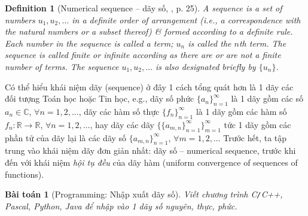 \documentclass{article}
\newtheorem{baitoan}{Bài toán}
\newtheorem{definition}{Definition}
\begin{document}
\begin{definition}[Numerical sequence -- dãy số, \cite{Wrede_Spiegel2010}, p. 25]
    A {\rm sequence} is a set of numbers $u_1,u_2,\ldots$ in a definite order of arrangement (i.e., a {\rm correspondence} with the natural numbers or a subset thereof) \& formed according to a definite rule. Each number in the sequence is called a {\rm term}; $u_n$ is called the {\rm$n$th term}. The sequence is called {\rm finite} or {\rm infinite} according as there are or are not a finite number of terms. The sequence $u_1,u_2,\ldots$ is also designated briefly by $\{u_n\}$.
\end{definition}
Có thể hiểu khái niệm dãy (sequence) ở đây 1 cách tổng quát hơn là 1 dãy các đối tượng Toán học hoặc Tin học, e.g., dãy số phức $\{a_n\}_{n=1}^\infty$ là 1 dãy gồm các số $a_n\in\mathbb{C}$, $\forall n = 1,2,\ldots$, dãy các hàm số thực $\{f_n\}_{n=1}^\infty$ là 1 dãy gồm các hàm số $f_n:\mathbb{R}\to\mathbb{R}$, $\forall n = 1,2,\ldots$, hay dãy các dãy $\{\{a_{m,n}\}_{n=1}^\infty\}_{m=1}^\infty$ tức 1 dãy gồm các phần tử của dãy lại là các dãy số $\{a_{m,n}\}_{n=1}^\infty$, $\forall m = 1,2,\ldots$ Trước hết, ta tập trung vào khái niệm dãy đơn giản nhất: dãy số -- numerical sequence, trước khi đến với khái niệm {\it hội tụ đều} của dãy hàm (uniform convergence of sequences of functions).

\begin{baitoan}[Programming: Nhập xuất dãy số]
    Viết chương trình {\sf C{\tt/}C++, Pascal, Python, Java} để nhập vào 1 dãy số nguyên, thực, phức.
\end{baitoan}
\end{document}
